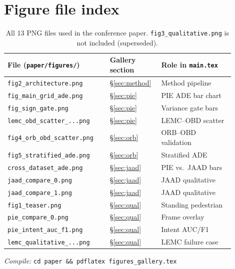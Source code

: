 \documentclass[11pt,a4paper]{article}
\begin{document}
\appendix
\section{Figure file index}

\begin{table}[H]
  \centering
  \footnotesize
  \setlength{\tabcolsep}{4pt}
  \begin{tabular}{@{}p{0.42\linewidth}p{0.18\linewidth}p{0.30\linewidth}@{}}
    \toprule
    File (\texttt{paper/figures/}) & Gallery section & Role in \texttt{main.tex} \\
    \midrule
    \texttt{fig2\_architecture.png} & \S\ref{sec:method} & Method pipeline \\
    \texttt{fig\_main\_grid\_ade.png} & \S\ref{sec:pie} & PIE ADE bar chart \\
    \texttt{fig\_sign\_gate.png} & \S\ref{sec:pie} & Variance gate bars \\
    \texttt{lemc\_obd\_scatter\_...png} & \S\ref{sec:pie} & LEMC--OBD scatter \\
    \texttt{fig4\_orb\_obd\_scatter.png} & \S\ref{sec:orb} & ORB--OBD validation \\
    \texttt{fig5\_stratified\_ade.png} & \S\ref{sec:orb} & Stratified ADE \\
    \texttt{cross\_dataset\_ade.png} & \S\ref{sec:jaad} & PIE vs.\ JAAD bars \\
    \texttt{jaad\_compare\_0.png} & \S\ref{sec:jaad} & JAAD qualitative \\
    \texttt{jaad\_compare\_1.png} & \S\ref{sec:jaad} & JAAD qualitative \\
    \texttt{fig1\_teaser.png} & \S\ref{sec:qual} & Standing pedestrian \\
    \texttt{pie\_compare\_0.png} & \S\ref{sec:qual} & Frame overlay \\
    \texttt{pie\_intent\_auc\_f1.png} & \S\ref{sec:qual} & Intent AUC/F1 \\
    \texttt{lemc\_qualitative\_...png} & \S\ref{sec:qual} & LEMC failure case \\
    \bottomrule
  \end{tabular}
  \caption{All 13 PNG files used in the conference paper. \texttt{fig3\_qualitative.png} is not included (superseded).}
\end{table}

\vfill
\noindent\small\textit{Compile:} \texttt{cd paper \&\& pdflatex figures\_gallery.tex}
\end{document}
